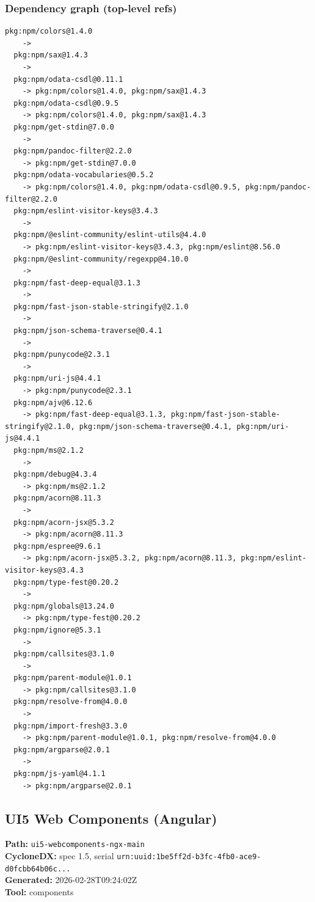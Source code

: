 \documentclass[11pt,a4paper]{article}
\begin{document}
\subsubsection*{Dependency graph (top-level refs)}
\begin{lstlisting}[style=depgraph]
  pkg:npm/colors@1.4.0
    -> 
  pkg:npm/sax@1.4.3
    -> 
  pkg:npm/odata-csdl@0.11.1
    -> pkg:npm/colors@1.4.0, pkg:npm/sax@1.4.3
  pkg:npm/odata-csdl@0.9.5
    -> pkg:npm/colors@1.4.0, pkg:npm/sax@1.4.3
  pkg:npm/get-stdin@7.0.0
    -> 
  pkg:npm/pandoc-filter@2.2.0
    -> pkg:npm/get-stdin@7.0.0
  pkg:npm/odata-vocabularies@0.5.2
    -> pkg:npm/colors@1.4.0, pkg:npm/odata-csdl@0.9.5, pkg:npm/pandoc-filter@2.2.0
  pkg:npm/eslint-visitor-keys@3.4.3
    -> 
  pkg:npm/@eslint-community/eslint-utils@4.4.0
    -> pkg:npm/eslint-visitor-keys@3.4.3, pkg:npm/eslint@8.56.0
  pkg:npm/@eslint-community/regexpp@4.10.0
    -> 
  pkg:npm/fast-deep-equal@3.1.3
    -> 
  pkg:npm/fast-json-stable-stringify@2.1.0
    -> 
  pkg:npm/json-schema-traverse@0.4.1
    -> 
  pkg:npm/punycode@2.3.1
    -> 
  pkg:npm/uri-js@4.4.1
    -> pkg:npm/punycode@2.3.1
  pkg:npm/ajv@6.12.6
    -> pkg:npm/fast-deep-equal@3.1.3, pkg:npm/fast-json-stable-stringify@2.1.0, pkg:npm/json-schema-traverse@0.4.1, pkg:npm/uri-js@4.4.1
  pkg:npm/ms@2.1.2
    -> 
  pkg:npm/debug@4.3.4
    -> pkg:npm/ms@2.1.2
  pkg:npm/acorn@8.11.3
    -> 
  pkg:npm/acorn-jsx@5.3.2
    -> pkg:npm/acorn@8.11.3
  pkg:npm/espree@9.6.1
    -> pkg:npm/acorn-jsx@5.3.2, pkg:npm/acorn@8.11.3, pkg:npm/eslint-visitor-keys@3.4.3
  pkg:npm/type-fest@0.20.2
    -> 
  pkg:npm/globals@13.24.0
    -> pkg:npm/type-fest@0.20.2
  pkg:npm/ignore@5.3.1
    -> 
  pkg:npm/callsites@3.1.0
    -> 
  pkg:npm/parent-module@1.0.1
    -> pkg:npm/callsites@3.1.0
  pkg:npm/resolve-from@4.0.0
    -> 
  pkg:npm/import-fresh@3.3.0
    -> pkg:npm/parent-module@1.0.1, pkg:npm/resolve-from@4.0.0
  pkg:npm/argparse@2.0.1
    -> 
  pkg:npm/js-yaml@4.1.1
    -> pkg:npm/argparse@2.0.1
\end{lstlisting}

\subsection{UI5 Web Components (Angular)}
\textbf{Path:} \texttt{ui5-webcomponents-ngx-main}
\\ \textbf{CycloneDX:} spec 1.5, serial \texttt{urn:uuid:1be5ff2d-b3fc-4fb0-ace9-d0fcbb64b06c...}
\\ \textbf{Generated:} 2026-02-28T09:24:02Z
\\ \textbf{Tool:} components
\end{document}
